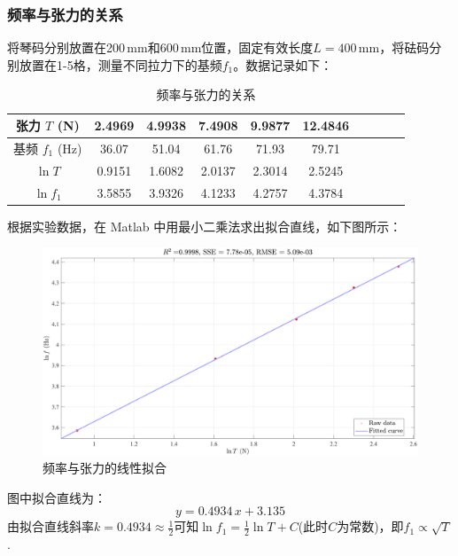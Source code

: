\documentclass[UTF8]{article}
\theoremstyle{MyLineTheoremStyle} %
\theoremstyle{MyBlockTheoremStyle} %
\theoremstyle{MySubsubsectionStyle} %
\begin{document}

\subsubsection{频率与张力的关系}
将琴码分别放置在200\,mm和600\,mm位置，固定有效长度$ L=400\,\mathrm{mm} $，将砝码分别放置在1-5格，测量不同拉力下的基频$ f_1 $。数据记录如下：
\begin{table}[H]\centering
    \caption{频率与张力的关系}
    \label{频率与张力的关系}
\begin{tabular}{cccccccccc}\toprule
    张力 $T$ (N)&2.4969&    4.9938&    7.4908&    9.9877&   12.4846\\
    \midrule
    基频 $f_1$ (Hz)&36.07&   51.04&   61.76&   71.93&   79.71\\
    $\ln T$&0.9151&   1.6082&    2.0137&    2.3014&    2.5245\\
    $\ln f_1$&3.5855&   3.9326&    4.1233&    4.2757&    4.3784\\
    \bottomrule
\end{tabular}
\end{table}
根据实验数据，在 Matlab 中用最小二乘法求出拟合直线，如下图所示：
\begin{figure}[H]\centering
    \includegraphics[width=0.9\columnwidth]{assets/4.pdf}
    \caption{频率与张力的线性拟合}
\end{figure}
图中拟合直线为：
\begin{equation}
y = 0.4934 \,x + 3.135
\end{equation}
由拟合直线斜率$ k=0.4934\approx\frac12 $可知$ \ln f_1=\frac 12\ln T+C $(此时$ C $为常数)，即$ f_1\propto\sqrt{T} $.
\end{document}
